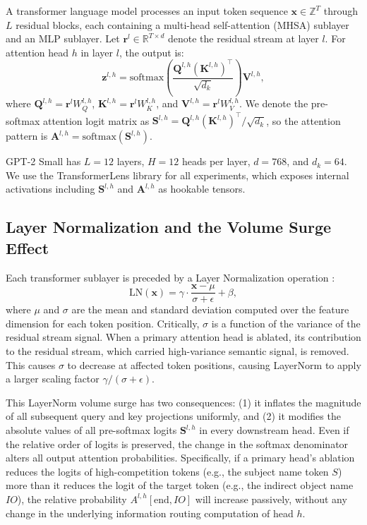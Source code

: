 \documentclass[12pt,a4paper]{article}
\begin{document}
A transformer language model \citep{vaswani2017attention} processes an input
token sequence $\mathbf{x} \in \mathbb{Z}^T$ through $L$ residual blocks, each
containing a multi-head self-attention (MHSA) sublayer and an MLP sublayer.
Let $\mathbf{r}^l \in \mathbb{R}^{T \times d}$ denote the residual stream at
layer $l$. For attention head $h$ in layer $l$, the output is:
\begin{equation}
  \mathbf{z}^{l,h} = \text{softmax}\!\left(\frac{\mathbf{Q}^{l,h}(\mathbf{K}^{l,h})^\top}{\sqrt{d_k}}\right)\mathbf{V}^{l,h},
  \label{eq:attn}
\end{equation}
where $\mathbf{Q}^{l,h} = \mathbf{r}^l W_Q^{l,h}$, $\mathbf{K}^{l,h} = \mathbf{r}^l W_K^{l,h}$,
and $\mathbf{V}^{l,h} = \mathbf{r}^l W_V^{l,h}$. We denote the
pre-softmax attention logit matrix as
$\mathbf{S}^{l,h} = \mathbf{Q}^{l,h}(\mathbf{K}^{l,h})^\top / \sqrt{d_k}$,
so the attention pattern is $\mathbf{A}^{l,h} = \text{softmax}(\mathbf{S}^{l,h})$.

GPT-2 Small \citep{radford2019language} has $L=12$ layers, $H=12$ heads per
layer, $d=768$, and $d_k=64$. We use the TransformerLens library
\citep{nanda2022transformerlens} for all experiments, which exposes internal
activations including $\mathbf{S}^{l,h}$ and $\mathbf{A}^{l,h}$ as hookable
tensors.

\subsection{Layer Normalization and the Volume Surge Effect}
\label{subsec:layernorm}

Each transformer sublayer is preceded by a Layer Normalization operation
\citep{ba2016layer}:
\begin{equation}
  \text{LN}(\mathbf{x}) = \gamma \cdot \frac{\mathbf{x} - \mu}{\sigma + \epsilon} + \beta,
\end{equation}
where $\mu$ and $\sigma$ are the mean and standard deviation computed over the
feature dimension for each token position. Critically, $\sigma$ is a function of
the variance of the residual stream signal. When a primary attention head is
ablated, its contribution to the residual stream, which carried high-variance
semantic signal, is removed. This causes $\sigma$ to decrease at affected token
positions, causing LayerNorm to apply a larger scaling factor $\gamma/(\sigma+\epsilon)$.

This LayerNorm volume surge has two consequences: (1) it inflates the magnitude
of all subsequent query and key projections uniformly, and (2) it modifies the
absolute values of all pre-softmax logits $\mathbf{S}^{l,h}$ in every downstream
head. Even if the relative order of logits is preserved, the change in the
softmax denominator alters all output attention probabilities. Specifically, if
a primary head's ablation reduces the logits of high-competition tokens
(e.g., the subject name token $S$) more than it reduces the logit of the
target token (e.g., the indirect object name $IO$), the relative probability
$A^{l,h}[\text{end}, IO]$ will increase passively, without any change in the
underlying information routing computation of head $h$.
\end{document}
